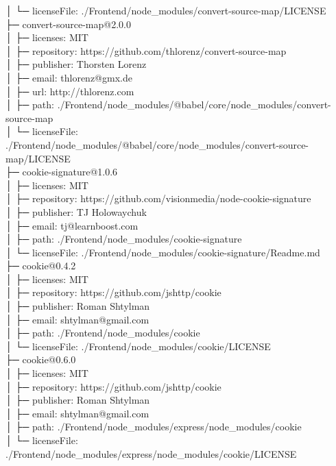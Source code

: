 \documentclass[
    paper=a4,
    twoside=false,
    parskip=half,
    listof=entryprefix,
    listof=totoc,
    index=totoc,
    bibliography=totoc,
    headsepline,
]{scrbook}
\begin{document}
    │  └─ licenseFile: ./Frontend/node\_modules/convert-source-map/LICENSE\\
    ├─ convert-source-map@2.0.0\\
    │  ├─ licenses: MIT\\
    │  ├─ repository: https://github.com/thlorenz/convert-source-map\\
    │  ├─ publisher: Thorsten Lorenz\\
    │  ├─ email: thlorenz@gmx.de\\
    │  ├─ url: http://thlorenz.com\\
    │  ├─ path: ./Frontend/node\_modules/@babel/core/node\_modules/convert-source-map\\
    │  └─ licenseFile: ./Frontend/node\_modules/@babel/core/node\_modules/convert-source-map/LICENSE\\
    ├─ cookie-signature@1.0.6\\
    │  ├─ licenses: MIT\\
    │  ├─ repository: https://github.com/visionmedia/node-cookie-signature\\
    │  ├─ publisher: TJ Holowaychuk\\
    │  ├─ email: tj@learnboost.com\\
    │  ├─ path: ./Frontend/node\_modules/cookie-signature\\
    │  └─ licenseFile: ./Frontend/node\_modules/cookie-signature/Readme.md\\
    ├─ cookie@0.4.2\\
    │  ├─ licenses: MIT\\
    │  ├─ repository: https://github.com/jshttp/cookie\\
    │  ├─ publisher: Roman Shtylman\\
    │  ├─ email: shtylman@gmail.com\\
    │  ├─ path: ./Frontend/node\_modules/cookie\\
    │  └─ licenseFile: ./Frontend/node\_modules/cookie/LICENSE\\
    ├─ cookie@0.6.0\\
    │  ├─ licenses: MIT\\
    │  ├─ repository: https://github.com/jshttp/cookie\\
    │  ├─ publisher: Roman Shtylman\\
    │  ├─ email: shtylman@gmail.com\\
    │  ├─ path: ./Frontend/node\_modules/express/node\_modules/cookie\\
    │  └─ licenseFile: ./Frontend/node\_modules/express/node\_modules/cookie/LICENSE\\
\end{document}

